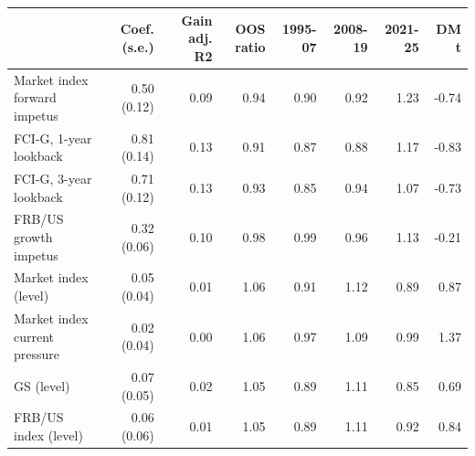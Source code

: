 \begin{tabular}{lrrrrrrr}
\toprule
 & Coef. (s.e.) & Gain adj. R2 & OOS ratio & 1995-07 & 2008-19 & 2021-25 & DM t \\
\midrule
Market index forward impetus & 0.50 (0.12) & 0.09 & 0.94 & 0.90 & 0.92 & 1.23 & -0.74 \\
FCI-G, 1-year lookback & 0.81 (0.14) & 0.13 & 0.91 & 0.87 & 0.88 & 1.17 & -0.83 \\
FCI-G, 3-year lookback & 0.71 (0.12) & 0.13 & 0.93 & 0.85 & 0.94 & 1.07 & -0.73 \\
FRB/US growth impetus & 0.32 (0.06) & 0.10 & 0.98 & 0.99 & 0.96 & 1.13 & -0.21 \\
Market index (level) & 0.05 (0.04) & 0.01 & 1.06 & 0.91 & 1.12 & 0.89 & 0.87 \\
Market index current pressure & 0.02 (0.04) & 0.00 & 1.06 & 0.97 & 1.09 & 0.99 & 1.37 \\
GS (level) & 0.07 (0.05) & 0.02 & 1.05 & 0.89 & 1.11 & 0.85 & 0.69 \\
FRB/US index (level) & 0.06 (0.06) & 0.01 & 1.05 & 0.89 & 1.11 & 0.92 & 0.84 \\
\bottomrule
\end{tabular}
